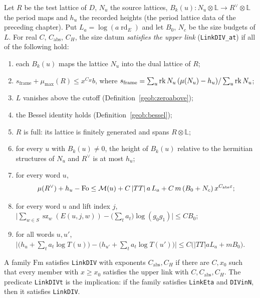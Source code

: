 \begin{definition}\label{geob:upperlink}
Let $R$ be the test lattice of $D$, $N_u$ the source lattices,
$B_k(u)\colon N_u\otimes\mathbb L\to R^{\vee}\otimes\mathbb L$ the period maps and
$h_u$ the recorded heights (the period lattice data of the preceding chapter).
Put $L_a=\log(a\operatorname{rd}_E)$ and let $B_0$, $N_c$ be the size budgets of
$L$. For real $C$, $C_{\mathrm{abs}}$, $C_H$, the size datum \emph{satisfies
the upper link} (\texttt{LinkDIV\_at}) if all of the following hold:
\begin{enumerate}
\item each $B_k(u)$ maps the lattice $N_u$ into the dual lattice of $R$;
\item $s_{\mathrm{frame}}+\mu_{\max}(R)\le x^{C_H}b$, where
$s_{\mathrm{frame}}=\sum_u\operatorname{rk} N_u\,(\mu(N_u)-h_u)/\sum_u\operatorname{rk} N_u$;
\item $L$ vanishes above the cutoff (Definition~\ref{geob:zeroabove});
\item the Bessel identity holds (Definition~\ref{geob:bessel});
\item $R$ is full: its lattice is finitely generated and spans $R\otimes\mathbb L$;
\item for every $u$ with $B_k(u)\ne0$, the height of $B_k(u)$ relative to the
hermitian structures of $N_u$ and $R^{\vee}$ is at most $h_u$;
\item for every word $u$,
\[
\mu(R^{\vee})+h_u-\mathrm{Fo}\le\mathcal M(u)+C\,|TT|\,a\,L_a+C\,m\,(B_0+N_c)\,x^{C_{\mathrm{abs}}\varepsilon};
\]
\item for every word $u$ and lift index $j$,
$\bigl|\sum_{w\in S}\operatorname{sz}_w(E(u,j,w))-\bigl(\sum_{t}a_t\bigr)\log(g_0g_1)\bigr|\le CB_0$;
\item for all words $u,u'$,
$\bigl|\bigl(h_u+\sum_ta_t\log T(u)\bigr)-\bigl(h_{u'}+\sum_ta_t\log T(u')\bigr)\bigr|
\le C\bigl(|TT|aL_a+mB_0\bigr)$.
\end{enumerate}
\end{definition}

\begin{definition}\label{geob:upperlink-fam}
A family $\mathrm{Fm}$ satisfies \texttt{LinkDIV} with exponents
$C_{\mathrm{abs}},C_H$ if there are $C,x_0$ such that every member with
$x\ge x_0$ satisfies the upper link with $C,C_{\mathrm{abs}},C_H$. The
predicate \texttt{LinkDIVt} is the implication: if the family satisfies
\texttt{LinkEta} and \texttt{DIVinN}, then it satisfies \texttt{LinkDIV}.
\end{definition}

